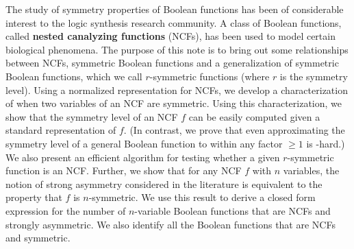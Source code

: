The study of symmetry properties of Boolean
functions has been of considerable interest to the
logic synthesis research community.
A class of Boolean functions, 
called \textbf{nested canalyzing functions} (NCFs),
has been used to model certain biological phenomena.
The purpose of this note is to bring out some relationships between NCFs, symmetric 
Boolean functions and a generalization of symmetric Boolean functions,
which we call $r$-symmetric functions (where $r$ is the symmetry level).
Using a normalized representation for NCFs, we develop a 
characterization of when two variables of an NCF are symmetric.
Using this characterization, we show 
that the symmetry level of an NCF $f$
can be easily computed given a standard representation of $f$.
(In contrast, we prove that even approximating the symmetry level of
a general Boolean function to within any factor $\geq 1$ is \cnp-hard.) 
We also present an efficient algorithm for testing whether 
a given $r$-symmetric function is an NCF.
Further, we show that for any NCF $f$ with $n$ variables, the notion of
strong asymmetry considered in the literature is equivalent to
the property that $f$ is $n$-symmetric. 
We use this result to derive a closed form expression for the
number of $n$-variable Boolean functions 
that are NCFs and strongly asymmetric.
We also identify all the Boolean functions that are NCFs 
and symmetric. 
